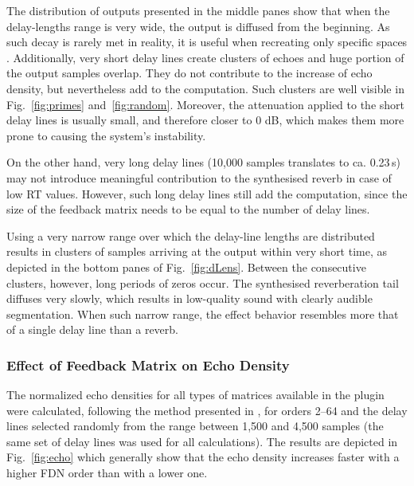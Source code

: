 \documentclass[twoside,a4paper]{article}
\begin{document}
The distribution of outputs presented in the middle panes show that when the delay-lengths range is very wide, the output is diffused from the beginning. As such decay is rarely met in reality, it is useful when recreating only specific spaces \cite{Oksanen13}. Additionally, very short delay lines create clusters of echoes and huge portion of the output samples overlap. They do not contribute to the increase of echo density, but nevertheless add to the computation. Such clusters are well visible in Fig.~\ref{fig:primes} and~\ref{fig:random}. Moreover, the attenuation applied to the short delay lines is usually small, and therefore closer to 0 dB, which makes them more prone to causing the system's instability.

On the other hand, very long delay lines (10,000 samples translates to ca. 0.23\,s) may not introduce meaningful contribution to the synthesised reverb in case of low RT values. However, such long delay lines still add the computation, since the size of the feedback matrix needs to be equal to the number of delay lines.

Using a very narrow range over which the delay-line lengths are distributed results in clusters of samples arriving at the output within very short time, as depicted in the bottom panes of Fig.~\ref{fig:dLens}. Between the consecutive clusters, however, long periods of zeros occur. The synthesised reverberation tail diffuses very slowly, which results in low-quality sound with clearly audible segmentation. When such narrow range, the effect behavior resembles more that of a single delay line than a reverb. 




\subsubsection{Effect of Feedback Matrix on Echo Density}\label{subsubsec:feedbackMatrix}

The normalized echo densities for all types of matrices available in the plugin were calculated, following the method presented in \cite{abel:2006, huang:2007, huang:2008}, for orders 2--64 and the delay lines selected randomly %
from the range between 1,500 and 4,500 samples (the same set of delay lines was used for all calculations). The results are depicted in Fig.~\ref{fig:echo} which generally show that the echo density increases faster with a higher FDN order than with a lower one. 
\end{document}
